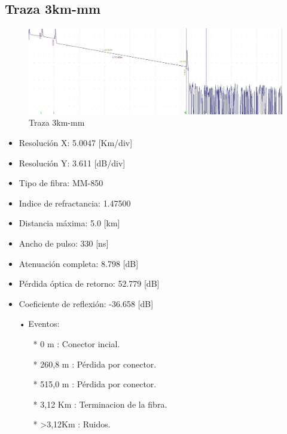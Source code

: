 \documentclass{article}
\begin{document}
\subsection{Traza 3km-mm}

\begin{figure}[h]
 \begin{center}
	\includegraphics[width=\textwidth]{imagenes/sim2.jpg} 
	\caption{Traza 3km-mm}\label{fig:fig1}
 \end{center}
\end{figure}

\begin{itemize}\itemsep0em \itemindent=2em
\item Resolución X: 5.0047 [Km/div]
\item Resolución Y:	3.611 [dB/div]
\item Tipo de fibra: MM-850
\item Indice de refractancia: 1.47500
\item Distancia máxima: 5.0 [km]
\item Ancho de pulso: 330 [ns]
\item Atenuación completa: 8.798 [dB]
\item Pérdida óptica de retorno: 52.779 [dB]
\item Coeficiente de reflexión: -36.658 [dB]
\end{itemize}


\begin{itemize}\itemsep0em \itemindent=2em
\item[•]Eventos:
	\begin{itemize}\itemsep0em \itemindent=2em
		\item[*] 0 m 	 : Conector incial.
		\item[*] 260,8 m : Pérdida por conector.
		\item[*] 515,0 m : Pérdida por conector.
		\item[*] 3,12 Km : Terminacion de la fibra.
		\item[*] >3,12Km : Ruidos.
	\end{itemize}
\end{itemize}
\end{document}
